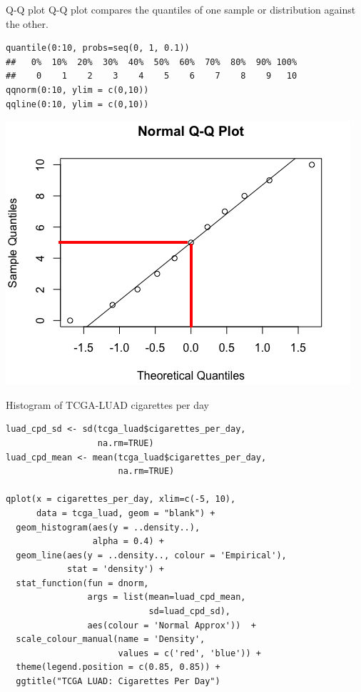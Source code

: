 \documentclass[12pt, t, xcolor=dvipsnames]{beamer}
\begin{document}
\begin{frame}[fragile]{Q-Q plot}
\alert{Q-Q plot} compares the quantiles of one sample or distribution against the other. 
\vspace{-3mm}

\begin{verbatim}
quantile(0:10, probs=seq(0, 1, 0.1))
##   0%  10%  20%  30%  40%  50%  60%  70%  80%  90% 100% 
##    0    1    2    3    4    5    6    7    8    9   10
qqnorm(0:10, ylim = c(0,10))
qqline(0:10, ylim = c(0,10))
\end{verbatim}

\vspace{-5mm}
\includegraphics[height=0.5\textheight, keepaspectratio]{seq0to10qq}

\end{frame}

\begin{frame}[fragile]{Histogram of TCGA-LUAD cigarettes per day}
\begin{verbatim}
luad_cpd_sd <- sd(tcga_luad$cigarettes_per_day, 
                  na.rm=TRUE)
luad_cpd_mean <- mean(tcga_luad$cigarettes_per_day, 
                      na.rm=TRUE)

qplot(x = cigarettes_per_day, xlim=c(-5, 10), 
      data = tcga_luad, geom = "blank") +  
  geom_histogram(aes(y = ..density..), 
                 alpha = 0.4) +
  geom_line(aes(y = ..density.., colour = 'Empirical'),
            stat = 'density') +  
  stat_function(fun = dnorm, 
                args = list(mean=luad_cpd_mean, 
                            sd=luad_cpd_sd), 
                aes(colour = 'Normal Approx'))  + 
  scale_colour_manual(name = 'Density', 
                      values = c('red', 'blue')) + 
  theme(legend.position = c(0.85, 0.85)) + 
  ggtitle("TCGA LUAD: Cigarettes Per Day")
\end{verbatim}
\end{frame}
\end{document}
